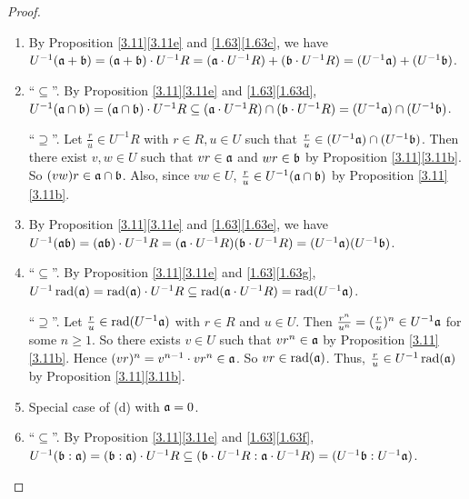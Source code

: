 \begin{proof}
    \begin{enumerate}
        \item By Proposition \ref{3.11}\ref{3.11e} and \ref{1.63}\ref{1.63c}, we have $U^{-1}(\mathfrak{a}+\mathfrak{b}) = (\mathfrak{a}+\mathfrak{b}) \cdot U^{-1}R = (\mathfrak{a} \cdot U^{-1}R) + (\mathfrak{b} \cdot U^{-1}R) = (U^{-1}\mathfrak{a}) + (U^{-1}\mathfrak{b})$.
        \item ``$\subseteq$''. By Proposition \ref{3.11}\ref{3.11e} and \ref{1.63}\ref{1.63d}, $U^{-1}(\mathfrak{a} \cap \mathfrak{b}) = (\mathfrak{a} \cap \mathfrak{b}) \cdot U^{-1}R \subseteq (\mathfrak{a} \cdot U^{-1}R) \cap (\mathfrak{b} \cdot U^{-1}R) = (U^{-1}\mathfrak{a}) \cap (U^{-1}\mathfrak{b})$. \par 
            ``$\supseteq$''. Let $\frac{r}{u} \in U^{-1}R$ with $r \in R,u \in U$ such that $\frac{r}{u} \in (U^{-1}\mathfrak{a}) \cap (U^{-1}\mathfrak{b})$. Then there exist $v,w \in U$ such that $vr \in \mathfrak{a}$ and $wr \in \mathfrak{b}$ by Proposition \ref{3.11}\ref{3.11b}. So $(vw)r \in \mathfrak{a} \cap \mathfrak{b}$. Also, since $vw \in U$, $\frac{r}{u} \in U^{-1}(\mathfrak{a} \cap \mathfrak{b})$ by Proposition \ref{3.11}\ref{3.11b}. \par
        \item By Proposition \ref{3.11}\ref{3.11e} and \ref{1.63}\ref{1.63e}, we have $U^{-1}(\mathfrak{a}\mathfrak{b}) = (\mathfrak{a}\mathfrak{b}) \cdot U^{-1}R = (\mathfrak{a} \cdot U^{-1}R)(\mathfrak{b} \cdot U^{-1}R) = (U^{-1}\mathfrak{a})(U^{-1}\mathfrak{b})$.
        \item ``$\subseteq$''. By Proposition \ref{3.11}\ref{3.11e} and \ref{1.63}\ref{1.63g}, $U^{-1} \operatorname{rad}(\mathfrak{a}) = \operatorname{rad}(\mathfrak{a}) \cdot U^{-1}R \subseteq \operatorname{rad}(\mathfrak{a} \cdot U^{-1}R) = \operatorname{rad}(U^{-1}\mathfrak{a})$. \par 
            ``$\supseteq$''. Let $\frac{r}{u} \in \operatorname{rad}(U^{-1}\mathfrak{a})$ with $r \in R$ and $u \in U$. Then $\frac{r^{n}}{u^{n}} = (\frac{r}{u})^{n} \in U^{-1}\mathfrak{a}$ for some $n \geq 1$. So there exists $v \in U$ such that $vr^{n} \in \mathfrak{a}$ by Proposition \ref{3.11}\ref{3.11b}. Hence $(vr)^{n} = v^{n-1} \cdot vr^{n} \in \mathfrak{a}$. So $vr \in \operatorname{rad}(\mathfrak{a})$. Thus, $\frac{r}{u} \in U^{-1} \operatorname{rad}(\mathfrak{a})$ by Proposition \ref{3.11}\ref{3.11b}.
        \item Special case of (d) with $\mathfrak{a} = 0$. 
        \item ``$\subseteq$''. By Proposition \ref{3.11}\ref{3.11e} and \ref{1.63}\ref{1.63f}, $U^{-1}(\mathfrak{b}:\mathfrak{a}) = (\mathfrak{b}:\mathfrak{a}) \cdot U^{-1}R \subseteq (\mathfrak{b} \cdot U^{-1}R: \mathfrak{a} \cdot U^{-1}R) = (U^{-1}\mathfrak{b}:U^{-1}\mathfrak{a})$. \par 

\end{enumerate}
\end{proof}
